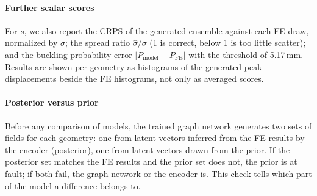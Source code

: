 \documentclass[preprint,12pt]{elsarticle}
\begin{document}
\paragraph{Further scalar scores} For $s$, we also report the CRPS of the generated ensemble
against each FE draw, normalized by $\sigma$; the spread ratio $\hat\sigma/\sigma$ (1 is correct,
below 1 is too little scatter); and the buckling-probability error $|P_{\text{model}}-P_{\text{FE}}|$
with the threshold of 5.17\,mm. Results are shown per geometry as histograms of the generated
peak displacements beside the FE histograms, not only as averaged scores.

\paragraph{Posterior versus prior} Before any comparison of models, the trained graph network
generates two sets of fields for each geometry: one from latent vectors inferred from the FE
results by the encoder (posterior), one from latent vectors drawn from the prior. If the
posterior set matches the FE results and the prior set does not, the prior is at fault; if both
fail, the graph network or the encoder is. This check tells which part of the model a
difference belongs to.
\end{document}
